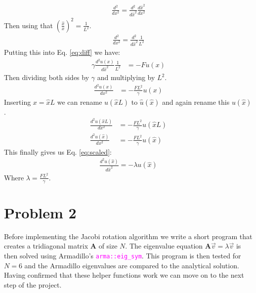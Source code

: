 \documentclass[english,notitlepage]{revtex4-1}  %
\begin{document}
\begin{align*}
    \frac{d^2}{dx^2} = \frac{d^2}{d\hat{x}^2} \frac{d\hat{x}^2}{dx^2}
\end{align*}
Then using that $\left(\frac{\hat{x}}{x} \right)^2 = \frac{1}{L^2}$.
\begin{align*}
    \frac{d^2}{dx^2} = \frac{d^2}{d\hat{x}^2} \frac{1}{L^2}
\end{align*}
Putting this into Eq. \ref*{eq:diff} we have:
\begin{align*}
    \gamma \frac{d^2 u(x)}{d\hat{x}^2} \frac{1}{L^2} &= - F u(x)
\end{align*}
Then dividing both sides by $\gamma$ and multiplying by $L^2$.
\begin{align*}
    \frac{d^2u(x)}{dx^2} &= - \frac{F L^2}{\gamma} u(x)
\end{align*}
Inserting $x = \hat{x}L$ we can rename $u(\hat{x}L)$ to $\hat{u}(\hat{x})$ and again rename this $u(\hat{x})$.
\begin{align*}
    \frac{d^2u(\hat{x}L)}{dx^2} &= - \frac{F L^2}{\gamma} u(\hat{x}L) \\
    \frac{d^2u(\hat{x})}{dx^2} &= - \frac{F L^2}{\gamma} u(\hat{x})
\end{align*}
This finally gives us Eq. \ref*{eq:scaled}:
\begin{align*}
    \frac{d^2u(\hat{x})}{d \hat{x}^2} = - \lambda u(\hat{x})
\end{align*}
Where $\lambda = \frac{F L^2}{\gamma}$.

\section*{Problem 2}
Before implementing the Jacobi rotation algorithm we write a short program
that creates a tridiagonal matrix $\textbf{A}$ of size $N$. The eigenvalue
equation $\textbf{A} \vec{v} = \lambda \vec{v}$ is then solved using Armadillo's \textcolor{magenta}{\texttt{arma::eig\_sym}}.
This program is then tested for $N = 6$ and the Armadillo eigenvalues are compared to the analytical solution.
Having confirmed that these helper functions work we can move on to the next step of the project.
\end{document}

